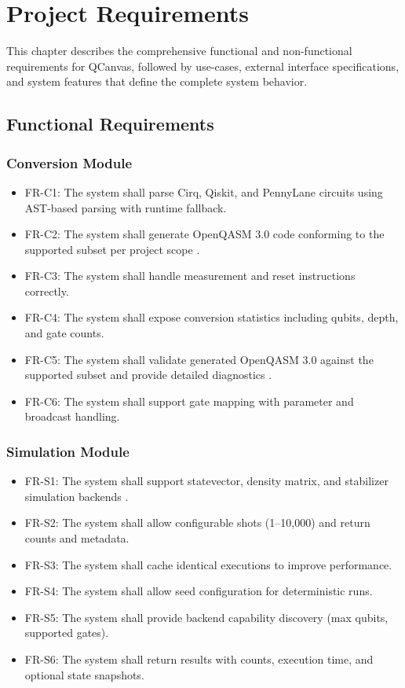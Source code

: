 \chapter{Project Requirements}

This chapter describes the comprehensive functional and non-functional requirements for QCanvas, followed by use-cases, external interface specifications, and system features that define the complete system behavior.

\section{Functional Requirements}

\subsection{Conversion Module}
\begin{itemize}
    \item FR-C1: The system shall parse Cirq, Qiskit, and PennyLane circuits using AST-based parsing with runtime fallback.
    \item FR-C2: The system shall generate OpenQASM 3.0 code conforming to the supported subset per project scope \cite{cross2021openqasm}.
    \item FR-C3: The system shall handle measurement and reset instructions correctly.
    \item FR-C4: The system shall expose conversion statistics including qubits, depth, and gate counts.
    \item FR-C5: The system shall validate generated OpenQASM 3.0 against the supported subset and provide detailed diagnostics \cite{cross2017openqasm}.
    \item FR-C6: The system shall support gate mapping with parameter and broadcast handling.
\end{itemize}

\subsection{Simulation Module}
\begin{itemize}
    \item FR-S1: The system shall support statevector, density matrix, and stabilizer simulation backends \cite{nielsen2010quantum}.
    \item FR-S2: The system shall allow configurable shots (1–10,000) and return counts and metadata.
    \item FR-S3: The system shall cache identical executions to improve performance.
    \item FR-S4: The system shall allow seed configuration for deterministic runs.
    \item FR-S5: The system shall provide backend capability discovery (max qubits, supported gates).
    \item FR-S6: The system shall return results with counts, execution time, and optional state snapshots.
\end{itemize}

